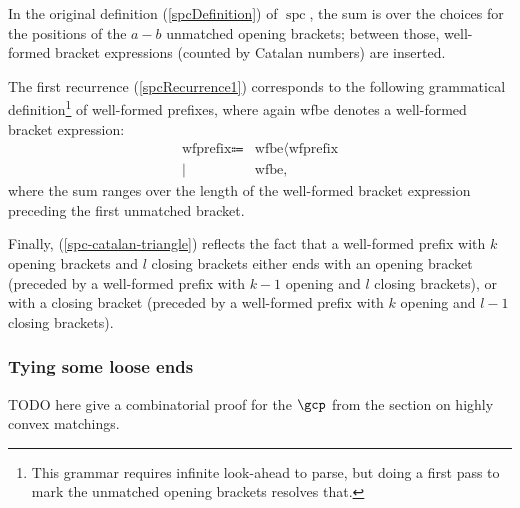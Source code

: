 \documentclass[10pt, a4paper, twoside]{basestyle}
\DeclareMathOperator{\spc}{spc}
\begin{document}
In the original definition (\ref{spcDefinition}) of $\spc$, the sum is over the choices for the positions of the
$a-b$ unmatched opening brackets; between those, well-formed bracket expressions (counted by Catalan numbers) are
inserted.

The first recurrence (\ref{spcRecurrence1}) corresponds to the following grammatical
definition\footnote{This grammar requires infinite look-ahead to parse, but doing a first pass to mark the
unmatched opening brackets resolves that.} of well-formed
prefixes, where again wfbe denotes a well-formed bracket expression:
\begin{align*}
\text{wfprefix} \Coloneq
& \text{wfbe} \langle \text{wfprefix} \\
\mid\: & \text{wfbe},
\end{align*}
where the sum ranges over the length of the well-formed bracket expression preceding the first unmatched bracket.

Finally, (\ref{spc-catalan-triangle}) reflects the fact that a well-formed prefix with $k$ opening brackets
and $l$ closing brackets either ends with an opening bracket (preceded by a well-formed prefix with $k-1$ opening
and $l$ closing brackets), or with a closing bracket (preceded by a well-formed prefix with $k$ opening
and $l-1$ closing brackets).
\subsubsection{Tying some loose ends}
TODO here give a combinatorial proof for the $\gcp$ from the section on highly convex matchings.
\end{document}
